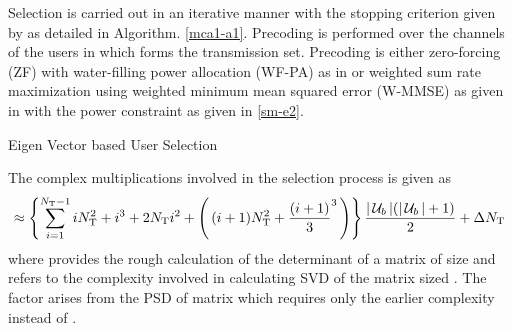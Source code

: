 Selection is carried out in an iterative manner with the stopping criterion given by  as detailed in Algorithm. \ref{mca1-a1}. Precoding is performed over the channels of the users in  which forms the transmission set. Precoding is either zero-forcing (ZF) with water-filling power allocation (WF-PA) as in \cite{tse2005fundamentals} or weighted sum rate maximization using weighted minimum mean squared error (W-MMSE) as given in \cite{wmmse_shi} with the power constraint as given in \eqref{sm-e2}.

\begin{algorithm}
 \SetAlgoLined
 \DontPrintSemicolon
 \caption{Eigen Vector based User Selection}
 \label{mca1-a1}
\end{algorithm}

The complex multiplications involved in the selection process is given as
\begin{equation}
\approx \left \lbrace \sum_{i = 1}^{N_{\mathrm{T}} - 1} iN^2_{\mathrm{T}} + i^3 + 2N_{\mathrm{T}}i^2 + \left ( \, (i+1)N^2_{\mathrm{T}} + \frac{(i+1)}{3}^3 \, \right ) \right \rbrace \frac{| \, \mathcal{U}_b \, |(| \, \mathcal{U}_b \, | + 1)}{2} + \Delta N_{\mathrm{T}}
\label{mca1-e4}
\end{equation}
where  provides the rough calculation of the determinant of a matrix of size  and \me{\Delta} refers to the complexity involved in calculating SVD of the matrix sized . The factor  arises from the PSD of matrix  which requires only the earlier complexity instead of .
